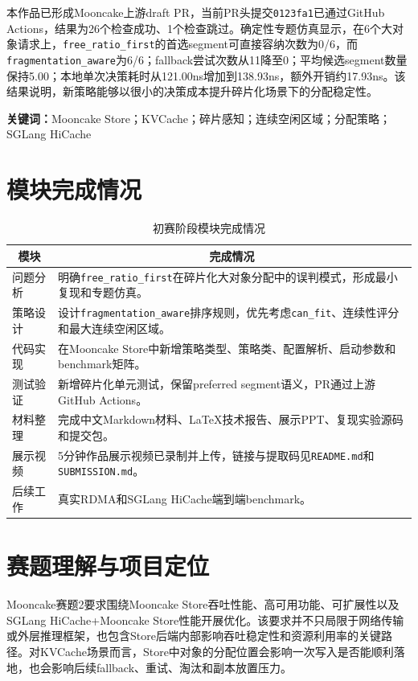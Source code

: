 \documentclass[UTF8,zihao=-4,a4paper]{ctexart}
\newcommand{\artifact}[1]{\texttt{#1}}
\newcommand{\strategy}{\texttt{fragmentation\_aware}}
\newcommand{\baseline}{\texttt{free\_ratio\_first}}
\newcommand{\thfirst}[1]{\multicolumn{1}{|c|}{\bfseries #1}}
\newcommand{\thcell}[1]{\multicolumn{1}{c|}{\bfseries #1}}
\begin{document}
本作品已形成Mooncake上游draft PR，当前PR头提交\artifact{0123fa1}已通过GitHub Actions，结果为26个检查成功、1个检查跳过。确定性专题仿真显示，在6个大对象请求上，\baseline{}的首选segment可直接容纳次数为0/6，而\strategy{}为6/6；fallback尝试次数从11降至0；平均候选segment数量保持5.00；本地单次决策耗时从121.00ns增加到138.93ns，额外开销约17.93ns。该结果说明，新策略能够以很小的决策成本提升碎片化场景下的分配稳定性。

\noindent\textbf{关键词：}Mooncake Store；KVCache；碎片感知；连续空闲区域；分配策略；SGLang HiCache

\newpage
\section*{模块完成情况}

\begin{table}[h]
  \centering
  \caption{初赛阶段模块完成情况}
  \begin{tabularx}{\textwidth}{|B{3.2cm}|Y|}
    \hline
    \thfirst{模块} & \thcell{完成情况} \\ \hline
    问题分析 & 明确\baseline{}在碎片化大对象分配中的误判模式，形成最小复现和专题仿真。 \\ \hline
    策略设计 & 设计\strategy{}排序规则，优先考虑\artifact{can\_fit}、连续性评分和最大连续空闲区域。 \\ \hline
    代码实现 & 在Mooncake Store中新增策略类型、策略类、配置解析、启动参数和benchmark矩阵。 \\ \hline
    测试验证 & 新增碎片化单元测试，保留preferred segment语义，PR通过上游GitHub Actions。 \\ \hline
    材料整理 & 完成中文Markdown材料、LaTeX技术报告、展示PPT、复现实验源码和提交包。 \\ \hline
    展示视频 & 5分钟作品展示视频已录制并上传，链接与提取码见\artifact{README.md}和\artifact{SUBMISSION.md}。 \\ \hline
    后续工作 & 真实RDMA和SGLang HiCache端到端benchmark。 \\ \hline
  \end{tabularx}
\end{table}

\newpage
\tableofcontents
\newpage
{}

\section{赛题理解与项目定位}

Mooncake赛题2要求围绕Mooncake Store吞吐性能、高可用功能、可扩展性以及SGLang HiCache+Mooncake Store性能开展优化。该要求并不只局限于网络传输或外层推理框架，也包含Store后端内部影响吞吐稳定性和资源利用率的关键路径。对KVCache场景而言，Store中对象的分配位置会影响一次写入是否能顺利落地，也会影响后续fallback、重试、淘汰和副本放置压力。
\end{document}
